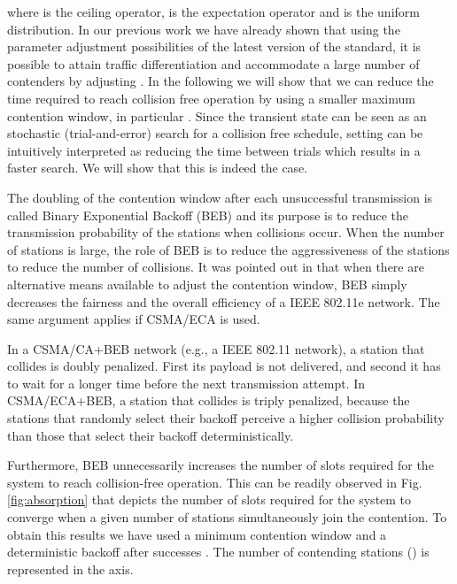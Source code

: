 \documentclass[journal]{IEEEtran}
\begin{document}
where  is the ceiling operator,  is the expectation operator and  is the uniform distribution. In our previous work we have already shown that using the parameter adjustment possibilities of the latest version of the standard, it is possible to attain traffic differentiation \cite{barcelo2009tpc} and accommodate a large number of contenders \cite{barcelo2010dpa} by adjusting .
In the following we will show that we can reduce the time required to reach collision free operation by using a smaller maximum contention window, in particular . 
Since the transient state can be seen as an stochastic (trial-and-error) search for a collision free schedule, setting  can be intuitively interpreted as reducing the time between trials which results in a faster search. We will show that this is indeed the case.

The doubling of the contention window after each unsuccessful transmission is called Binary Exponential Backoff (BEB) and its purpose is to reduce the transmission probability of the stations when collisions occur. When the number of stations is large, the role of BEB is to reduce the aggressiveness of the stations to reduce the number of collisions. It was pointed out in \cite{banchs2006tao} that when there are alternative means available to adjust the contention window, BEB simply decreases the fairness and the overall efficiency of a IEEE 802.11e network. The same argument applies if CSMA/ECA is used.

In a CSMA/CA+BEB network (e.g., a IEEE 802.11 network), a station that collides is doubly penalized. First its payload is not delivered, and second it has to wait for a longer time before the next transmission attempt. In CSMA/ECA+BEB, a station that collides is triply penalized, because the stations that randomly select their backoff perceive a higher collision probability than those that select their backoff deterministically.

Furthermore, BEB unnecessarily increases the number of slots required for the system to reach collision-free operation. This can be readily observed in Fig. \ref{fig:absorption} that depicts the number of slots required for the system to converge when a given number of stations simultaneously join the contention. To obtain this results we have used a minimum contention window  and a deterministic backoff after successes . The number of contending stations  () is represented in the  axis. 
\end{document}
